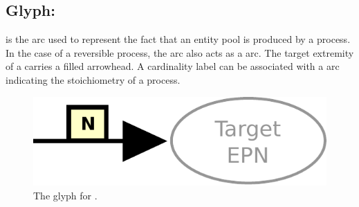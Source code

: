 
\subsection{Glyph: }\label{sec:production}

 is the arc used to represent the fact that an entity pool is produced by a process. In the case of a reversible process, the 
 arc also acts as a  arc. The target extremity of a  carries a filled arrowhead. A cardinality label can be associated with a  arc indicating the stoichiometry of a process.

\begin{figure}[H]
  \centering
  \includegraphics[scale = 0.4]{images/production}
  \caption{The \PD glyph for .}
  \label{fig:production}
\end{figure}
